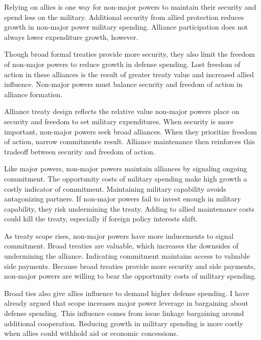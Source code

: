 \documentclass[12pt]{article}
\begin{document}
Relying on allies is one way for non-major powers to maintain their security and spend less on the military.  
Additional security from allied protection reduces growth in non-major power military spending. 
Alliance participation does not always lower expenditure growth, however. 


Though broad formal treaties provide more security, they also limit the freedom of non-major powers to reduce growth in defense spending.
Lost freedom of action in these alliances is the result of greater treaty value and increased allied influence. 
Non-major powers must balance security and freedom of action in alliance formation. 


Alliance treaty design reflects the relative value non-major powers place on security and freedom to set military expenditures. 
When security is more important, non-major powers seek broad alliances.
When they prioritize freedom of action, narrow commitments result. 
Alliance maintenance then reinforces this tradeoff between security and freedom of action. 


Like major powers, non-major powers maintain alliances by signaling ongoing commitment. 
The opportunity costs of military spending make high growth a costly indicator of commitment. 
Maintaining military capability avoids antagonizing partners. 
If non-major powers fail to invest enough in military capability, they risk undermining the treaty. 
Adding to allied maintenance costs could kill the treaty, especially if foreign policy interests shift. 


As treaty scope rises, non-major powers have more inducements to signal commitment.
Broad treaties are valuable, which increases the downsides of undermining the alliance. 
Indicating commitment maintains access to valuable side payments.   
Because broad treaties provide more security and side payments, non-major powers are willing to bear the opportunity costs of military spending. 


Broad ties also give allies influence to demand higher defense spending. 
I have already argued that scope increases major power leverage in bargaining about defense spending. 
This influence comes from issue linkage bargaining around additional cooperation. 
Reducing growth in military spending is more costly when allies could withhold aid or economic concessions. 
\end{document}
